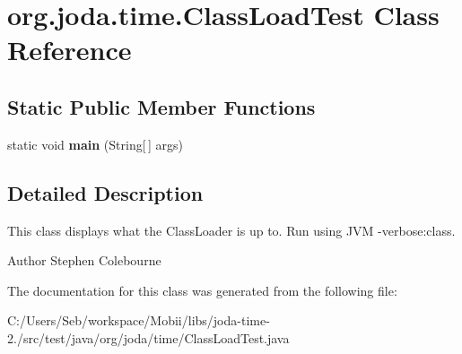 \hypertarget{classorg_1_1joda_1_1time_1_1_class_load_test}{\section{org.\-joda.\-time.\-Class\-Load\-Test Class Reference}
\label{classorg_1_1joda_1_1time_1_1_class_load_test}
}
\subsection*{Static Public Member Functions}
\begin{DoxyCompactItemize}
\item 
\hypertarget{classorg_1_1joda_1_1time_1_1_class_load_test_a6e11de5b747a23dd9d4fff9a8c258209}{static void {\bfseries main} (String\mbox{[}$\,$\mbox{]} args)}\label{classorg_1_1joda_1_1time_1_1_class_load_test_a6e11de5b747a23dd9d4fff9a8c258209}

\end{DoxyCompactItemize}


\subsection{Detailed Description}
This class displays what the Class\-Loader is up to. Run using J\-V\-M -\/verbose\-:class.

\begin{DoxyAuthor}{Author}
Stephen Colebourne 
\end{DoxyAuthor}


The documentation for this class was generated from the following file\-:\begin{DoxyCompactItemize}
\item 
C\-:/\-Users/\-Seb/workspace/\-Mobii/libs/joda-\/time-\/2./src/test/java/org/joda/time/Class\-Load\-Test.\-java\end{DoxyCompactItemize}
